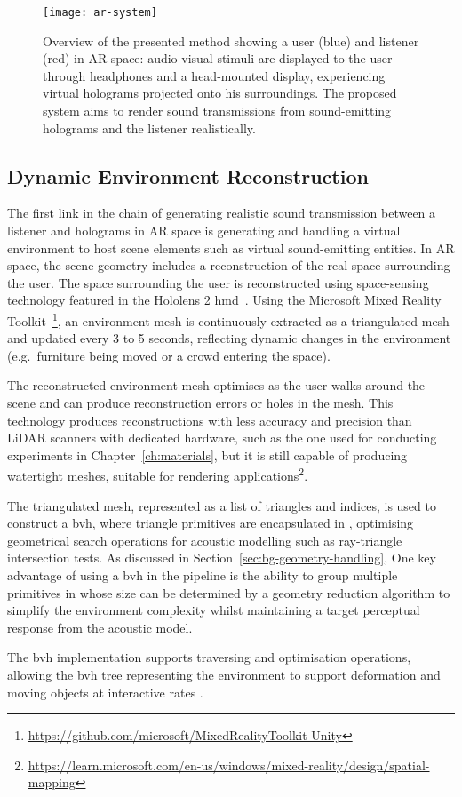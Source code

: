 \begin{figure}[htb]
    \centering
    \texttt{[image: ar-system]}
    \caption[High-level diagram of the proposed sound rendering pipeline]{Overview of the presented method showing a user (blue) and listener (red) in AR space: audio-visual stimuli are displayed to the user through headphones and a head-mounted display, experiencing virtual holograms projected onto his surroundings. The proposed system aims to render sound transmissions from sound-emitting holograms and the listener realistically.}
\label{fig:method-overview}
\end{figure}

\subsection{Dynamic Environment Reconstruction}
The first link in the chain of generating realistic sound transmission between a listener and holograms in AR space is generating and handling a virtual environment to host scene elements such as virtual sound-emitting entities. In AR space, the scene geometry includes a reconstruction of the real space surrounding the user. The space surrounding the user is reconstructed using space-sensing technology featured in the Hololens 2 \acrshort{hmd}~\citep{ungureanu2020hololens}. Using the Microsoft Mixed Reality Toolkit~\footnote{\url{https://github.com/microsoft/MixedRealityToolkit-Unity}}, an environment mesh is continuously extracted as a triangulated mesh and updated every 3 to 5 seconds, reflecting dynamic changes in the environment (e.g.\ furniture being moved or a crowd entering the space).\par
The reconstructed environment mesh optimises as the user walks around the scene and can produce reconstruction errors or holes in the mesh. This technology produces reconstructions with less accuracy and precision than LiDAR scanners with dedicated hardware, such as the one used for conducting experiments in Chapter~\ref{ch:materials}, but it is still capable of producing watertight meshes, suitable for rendering applications\footnote{\url{https://learn.microsoft.com/en-us/windows/mixed-reality/design/spatial-mapping}}.\par  
The triangulated mesh, represented as a list of triangles and indices, is used to construct a \acrfull{bvh}, where triangle primitives are encapsulated in , optimising geometrical search operations for acoustic modelling such as ray-triangle intersection tests. As discussed in Section~\ref{sec:bg-geometry-handling}, One key advantage of using a \acrshort{bvh} in the pipeline is the ability to group multiple primitives in  whose size can be determined by a geometry reduction algorithm to simplify the environment complexity whilst maintaining a target perceptual response from the acoustic model.\par
The \acrshort{bvh} implementation supports traversing and optimisation operations, allowing the \acrshort{bvh} tree representing the environment to support deformation and moving objects at interactive rates \citep{wald2007ray}.

